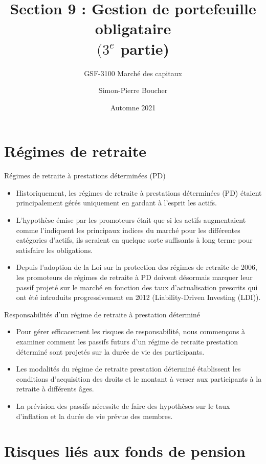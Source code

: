 \documentclass{beamer}
\title[S10]{Section 9 : Gestion de portefeuille obligataire \\ $(3^{e}$ partie)}
\subtitle{GSF-3100 Marché des capitaux}
\author[SP. Boucher]{Simon-Pierre Boucher\inst{1}}
\institute[Université Laval]
{
  \inst{1}%
  Département de finance, assurance et immobilier\\
  Faculté des sciences de l'administration\\
  Université Laval}
\date[Automne 2021]{Automne 2021}
\begin{document}
\begin{frame}
  \titlepage
\end{frame}


\section{Régimes de retraite}

\begin{frame}{Régimes de retraite à prestations déterminées (PD)}
\begin{itemize}[label=\bullet]
\item Historiquement, les régimes de retraite à prestations déterminées (PD) étaient principalement gérés uniquement en gardant à l'esprit les actifs.
\item L'hypothèse émise par les promoteurs était que si les actifs augmentaient comme l'indiquent les principaux indices du marché pour les différentes catégories d'actifs, ils seraient en quelque sorte suffisants à long terme pour satisfaire les obligations.
\item Depuis l'adoption de la Loi sur la protection des régimes de retraite de 2006, les promoteurs de régimes de retraite à PD doivent désormais marquer leur passif projeté sur le marché en fonction des taux d'actualisation prescrits qui ont été introduits progressivement en 2012 (Liability-Driven Investing (LDI)).
\end{itemize}
\end{frame}

\begin{frame}{Responsabilités d’un régime de retraite à prestation déterminé}
\begin{itemize}[label=\bullet]
\item Pour gérer efficacement les risques de responsabilité, nous commençons à examiner comment les passifs futurs d’un régime de retraite prestation déterminé sont projetés sur la durée de vie des participants.
\item Les modalités du régime de retraite prestation déterminé  établissent les conditions d'acquisition des droits et le montant à verser aux participants à la retraite à différents âges.
\item La prévision des passifs nécessite de faire des hypothèses sur le taux d'inflation et la durée de vie prévue des membres.
\end{itemize}
\end{frame}

\section{Risques liés aux fonds de pension}
\end{document}
